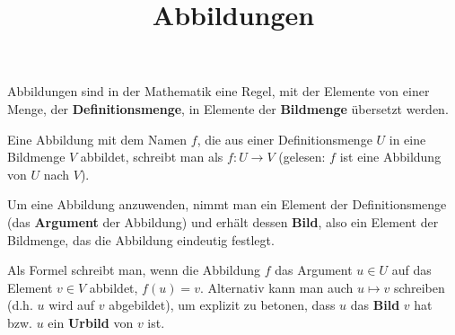 \documentclass[solution]{uebungsblatt}
\title{Abbildungen}
\begin{document}
\maketitle

\begin{remark}{}
\parpic[r]{
}
Abbildungen sind in der Mathematik eine Regel, mit der Elemente von einer Menge, der \textbf{Definitionsmenge}, in Elemente der \textbf{Bildmenge} übersetzt werden.

Eine Abbildung mit dem Namen $f$, die aus einer Definitionsmenge $U$ in eine Bildmenge $V$ abbildet, schreibt man als $f\colon U\rightarrow V$ (gelesen: $f$ ist eine Abbildung von $U$ nach $V$).

Um eine Abbildung anzuwenden, nimmt man ein Element der Definitionsmenge (das \textbf{Argument} der Abbildung) und erhält dessen \textbf{Bild}, also ein Element der Bildmenge, das die Abbildung eindeutig festlegt. 

Als Formel schreibt man, wenn die Abbildung $f$ das Argument $u\in U$ auf das Element $v\in V$ abbildet, $f(u)=v$. Alternativ kann man auch $u\mapsto v$ schreiben (d.h. $u$ wird auf $v$ abgebildet), um explizit zu betonen, dass $u$ das \textbf{Bild} $v$ hat bzw. $u$ ein \textbf{Urbild} von $v$ ist.

\dotfill
\begin{center}
    \hspace*{6mm}
\end{center}

\end{remark}
\end{document}
